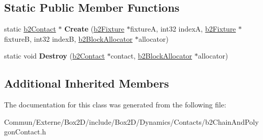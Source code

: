 \subsection*{Static Public Member Functions}
\begin{DoxyCompactItemize}
\item 
static \hyperlink{classb2_contact}{b2\+Contact} $\ast$ {\bfseries Create} (\hyperlink{classb2_fixture}{b2\+Fixture} $\ast$fixtureA, int32 indexA, \hyperlink{classb2_fixture}{b2\+Fixture} $\ast$fixtureB, int32 indexB, \hyperlink{classb2_block_allocator}{b2\+Block\+Allocator} $\ast$allocator)\hypertarget{classb2_chain_and_polygon_contact_aae40d48ef8f2a49297a38c615a79e3b2}{}\label{classb2_chain_and_polygon_contact_aae40d48ef8f2a49297a38c615a79e3b2}

\item 
static void {\bfseries Destroy} (\hyperlink{classb2_contact}{b2\+Contact} $\ast$contact, \hyperlink{classb2_block_allocator}{b2\+Block\+Allocator} $\ast$allocator)\hypertarget{classb2_chain_and_polygon_contact_aed8a69453a9d7bb77a3c2b70fb20c764}{}\label{classb2_chain_and_polygon_contact_aed8a69453a9d7bb77a3c2b70fb20c764}

\end{DoxyCompactItemize}
\subsection*{Additional Inherited Members}


The documentation for this class was generated from the following file\+:\begin{DoxyCompactItemize}
\item 
Commun/\+Externe/\+Box2\+D/include/\+Box2\+D/\+Dynamics/\+Contacts/b2\+Chain\+And\+Polygon\+Contact.\+h\end{DoxyCompactItemize}

